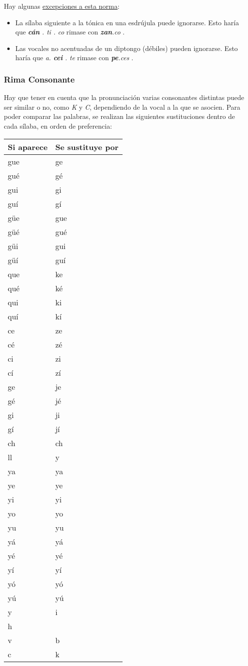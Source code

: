 \documentclass[11pt]{article}
\begin{document}
Hay algunas \href{https://lengualdia.blogspot.com/2012/02/excepciones-de-la-rima-los-diptongos-y.html?m=1}{excepciones a esta norma}:
\begin{itemize}
\item La sílaba siguiente a la tónica en una esdrújula puede ignorarse. Esto haría que \emph{\textbf{cán} . ti . co} rimase con \emph{\textbf{zan}.co} .
\item Las vocales no acentuadas de un diptongo (débiles) pueden ignorarse. Esto haría que \emph{a. \textbf{cei} . te} rimase con \emph{\textbf{pe}.ces} .
\end{itemize}

\subsubsection{Rima Consonante}
\label{sec:org000000f}
Hay que tener en cuenta que la pronunciación varias consonantes distintas puede ser similar o no, como \emph{K} y \emph{C}, dependiendo de la vocal a la que se asocien. Para poder comparar las palabras, se realizan las siguientes sustituciones dentro de cada sílaba, en orden de preferencia:
\begin{center}
\begin{tabular}{ll}
Si aparece & Se sustituye por\\
\hline
gue & ge\\
gué & gé\\
gui & gi\\
guí & gí\\
güe & gue\\
güé & gué\\
güi & gui\\
güí & guí\\
que & ke\\
qué & ké\\
qui & ki\\
quí & kí\\
ce & ze\\
cé & zé\\
ci & zi\\
cí & zí\\
ge & je\\
gé & jé\\
gi & ji\\
gí & jí\\
ch & ch\\
ll & y\\
ya & ya\\
ye & ye\\
yi & yi\\
yo & yo\\
yu & yu\\
yá & yá\\
yé & yé\\
yí & yí\\
yó & yó\\
yú & yú\\
y & i\\
h & \\
v & b\\
c & k\\
\end{tabular}
\end{center}
\end{document}
